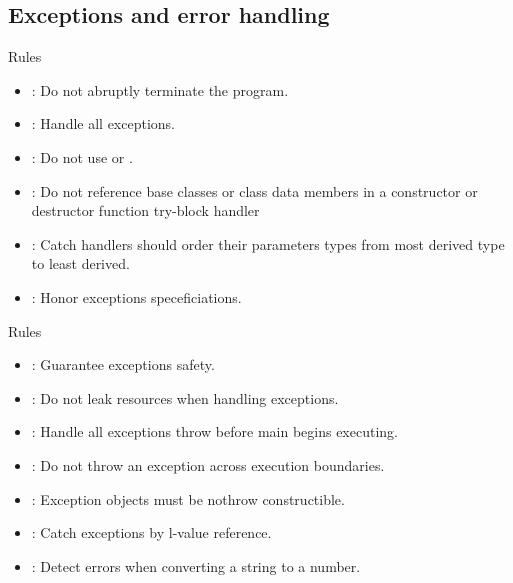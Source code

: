 \subsection{Exceptions and error handling}

\begin{frame}[t]{Rules}
\begin{itemize}
  \item {}: 
        Do not abruptly terminate the program.
  \vfill
  \item {}: 
        Handle all exceptions.
  \vfill
  \item {}: 
        Do not use  or .
  \vfill
  \item {}: 
        Do not reference base classes or class data members in a constructor
        or destructor function try-block handler
  \vfill
  \item {}: 
        Catch handlers should order their parameters types from most derived type to least
        derived.
  \vfill
  \item {}: 
        Honor exceptions speceficiations.
\end{itemize}
\end{frame}


\begin{frame}[t]{Rules}
\begin{itemize}
  \vfill
  \item {}: 
        Guarantee exceptions safety.
  \vfill
  \item {}: 
        Do not leak resources when handling exceptions.
  \vfill
  \item {}: 
        Handle all exceptions throw before main begins executing.
  \vfill
  \item {}: 
        Do not throw an exception across execution boundaries.
  \vfill
  \item {}: 
        Exception objects must be nothrow constructible.
  \vfill
  \item {}: 
        Catch exceptions by l-value reference.
  \vfill
  \item {}: 
        Detect errors when converting a string to a number.
\end{itemize}
\end{frame}



